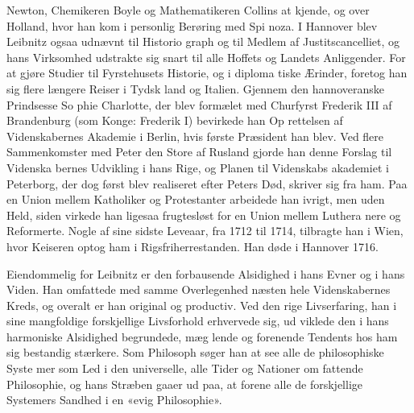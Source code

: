 \documentclass[12pt,a4paper]{book}
\begin{document}
Newton, Chemikeren Boyle og Mathematikeren Collins at kjende,
og over Holland, hvor han kom i personlig Berøring med Spi\-%
noza. I Hannover blev Leibnitz ogsaa udnævnt til Historio\-%
graph og til Medlem af Justitscancelliet, og hans Virksomhed
udstrakte sig snart til alle Hoffets og Landets Anliggender.
For at gjøre Studier til Fyrstehusets Historie, og i diploma\-%
tiske Ærinder, foretog han sig flere længere Reiser i Tydsk\-%
land og Italien. Gjennem den hannoveranske Prindsesse So\-%
phie Charlotte, der blev formælet med Churfyrst Frederik III
af Brandenburg (som Konge: Frederik I) bevirkede han Op\-%
rettelsen af Videnskabernes Akademie i Berlin, hvis første
Præsident han blev. Ved flere Sammenkomster med Peter
den Store af Rusland gjorde han denne Forslag til Videnska\-%
bernes Udvikling i hans Rige, og Planen til Videnskabs\-%
akademiet i Peterborg, der dog først blev realiseret efter Peters
Død, skriver sig fra ham. Paa en Union mellem Katholiker
og Protestanter arbeidede han ivrigt, men uden Held, siden
virkede han ligesaa frugtesløst for en Union mellem Luthera\-%
nere og Reformerte. Nogle af sine sidste Leveaar, fra 1712
til 1714, tilbragte han i Wien, hvor Keiseren optog ham i
Rigsfriherrestanden. Han døde i Hannover 1716.

Eiendommelig for Leibnitz er den forbausende Alsidighed
i hans Evner og i hans Viden. Han omfattede med samme
Overlegenhed næsten hele Videnskabernes Kreds, og overalt
er han original og productiv. Ved den rige Livserfaring, han
i sine mangfoldige forskjellige Livsforhold erhvervede sig, ud\-%
viklede den i hans harmoniske Alsidighed begrundede, mæg\-%
lende og forenende Tendents hos ham sig bestandig stærkere.
Som Philosoph søger han at see alle de philosophiske Syste\-%
mer som Led i den universelle, alle Tider og Nationer om\-%
fattende Philosophie, og hans Stræben gaaer ud paa, at forene
alle de forskjellige Systemers Sandhed i en «evig Philosophie».
\end{document}

